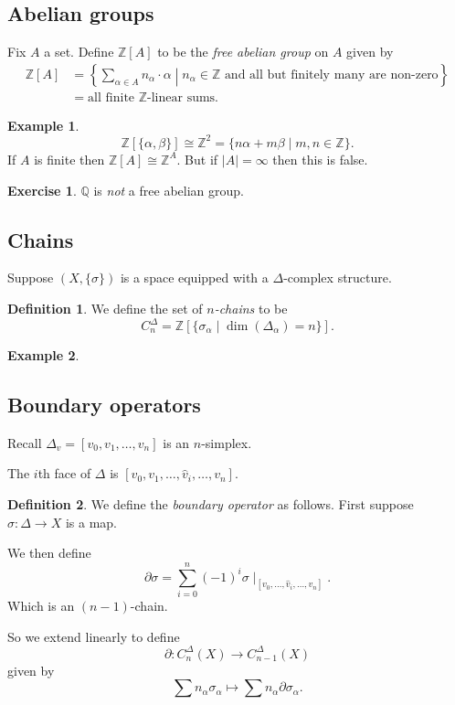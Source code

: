 \documentclass{article}
\theoremstyle{definition}
\newtheorem*{defn}{Definition}
\newtheorem*{ex}{Example}
\newtheorem*{exer}{Exercise}
\newcommand{\ZZ}{\mathbb{Z}}
\newcommand{\QQ}{\mathbb{Q}}
\begin{document}
\subsection{Abelian groups}
Fix $A$ a set.
Define $\ZZ[A]$ to be the \emph{free abelian group} on $A$ given by
\begin{align*}
\ZZ[A] &= \left\{ \sum_{\alpha\in A} n_\alpha \cdot \alpha \middle| n_\alpha\in\ZZ\text{ and all but finitely many are non-zero}\right\} \\
&= \text{all finite $\ZZ$-linear sums}.
\end{align*}

\begin{ex}
\[\ZZ[\{\alpha,\beta\}] \cong \ZZ^2 = \{n\alpha + m\beta \mid m,n\in \ZZ\}.\]
If $A$ is finite then $\ZZ[A] \cong \ZZ^A$.
But if $|A| = \infty$ then this is false.
\end{ex}

\begin{exer}
$\QQ$ is \emph{not} a free abelian group.
\end{exer}

\subsection{Chains}
Suppose $(X,\{\sigma\})$ is a space equipped with a $\Delta$-complex structure.

\begin{defn}
We define the set of \emph{$n$-chains} to be
\[C_n^\Delta = \ZZ[\{\sigma_\alpha \mid \dim(\Delta_\alpha) = n\}].\]
\end{defn}

\begin{ex}
\end{ex}

\subsection{Boundary operators}
Recall $\Delta_v = [v_0, v_1,\ldots,v_n]$ is an $n$-simplex.

The $i$th face of $\Delta$ is $[v_0, v_1, \ldots , \hat{v}_i, \ldots ,v_n]$. %

\begin{defn}
We define the \emph{boundary operator} as follows.
First suppose $\sigma \colon \Delta \to X$ is a map.

We then define
\[\partial \sigma = \sum_{i=0}^{n} (-1)^i \sigma \mid_{[v_0,\ldots,\hat{v}_i, \ldots, v_n]}.\]
Which is an $(n-1)$-chain.

So we extend linearly to define 
\[\partial \colon C_n^\Delta(X) \to C_{n-1}^\Delta (X)\]
given by
\[\sum n_\alpha \sigma_\alpha \mapsto \sum n_\alpha \partial \sigma_\alpha.\]
\end{defn}
\end{document}
